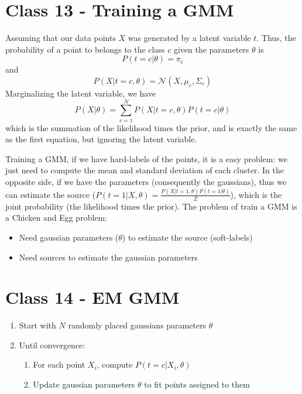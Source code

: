 \documentclass{article}
\begin{document}
\section{Class 13 - Training a GMM}
Assuming that our data points $X$ was generated by a latent variable $t$. Thus, the probability of a point to belongs to the class $c$ given the parameters $\theta$ is
\begin{equation}
    P(t = c|\theta) = \pi_c
\end{equation}
and 
\begin{equation}
    P(X|t = c, \theta) = \mathcal{N}(X, \mu_c, \Sigma_c)
\end{equation}
Marginalizing the latent variable, we have
\begin{equation}
    P(X|\theta) = \sum_{c=1}^N P(X|t = c, \theta)P(t = c|\theta)
\end{equation}
which is the summation of the likelihood times the prior, and is exactly the same as the first equation, but ignoring the latent variable.

Training a GMM, if we have hard-labels of the points, it is a easy problem: we just need to compute the mean and standard deviation of each cluster. In the opposite side, if we have the parameters (consequently the gaussians), thus we can estimate the source ($P(t = 1|X, \theta) = \frac{P(X|t = 1, \theta)P(t = 1|\theta)}{Z}$), which is the joint probability (the likelihood times the prior). The problem of train a GMM is a Chicken and Egg problem:
\begin{itemize}
    \item Need gaussian parameters ($\theta$) to estimate the source (soft-labels)
    \item Need sources to estimate the gaussian parameters
\end{itemize}

\section{Class 14 - EM GMM}
\begin{enumerate}
    \item Start with $N$ randomly placed gaussians parameters $\theta$
    \item Until convergence: \begin{enumerate}
        \item For each point $X_i$, compute $P(t = c|X_i, \theta)$
        \item Update gaussian parameters $\theta$ to fit points assigned to them
    \end{enumerate}
\end{enumerate}
\end{document}
